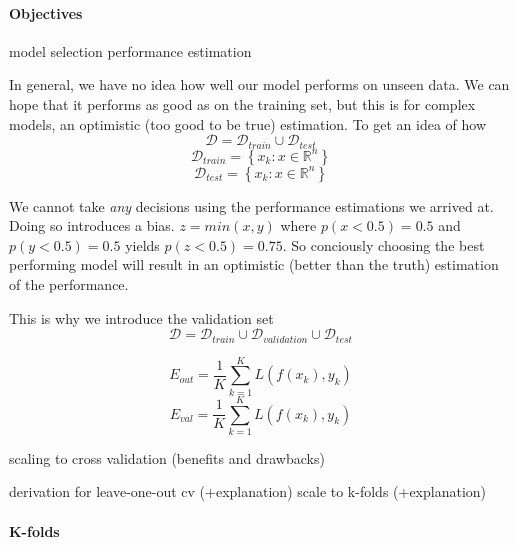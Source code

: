 \paragraph{Objectives}
   model selection
   performance estimation


In general, we have no idea how well our model performs on unseen data. We can hope that it performs as good as on the training set, but this is for complex models, an optimistic (too good to be true) estimation. To get an idea of how 
\begin{equation}
\mathcal{D} = \mathcal{D}_{train} \cup \mathcal{D}_{test}
\end{equation}
\begin{equation}
\mathcal{D}_{train} = \left\{x_k : x \in \mathbb{R}^{n}\right\}
\end{equation}
\begin{equation}
\mathcal{D}_{test} = \left\{x_k : x \in \mathbb{R}^{n}\right\}
\end{equation}



We cannot take \emph{any} decisions using the performance estimations we arrived at. Doing so introduces a bias.
$z = min( x, y )$ where $p(x<0.5) = 0.5$ and $p(y<0.5) = 0.5$ yields $p(z<0.5) = 0.75$. So conciously choosing the best performing model will result in an optimistic (better than the truth) estimation of the performance.

This is why we introduce the validation set
\begin{equation}
\mathcal{D} = \mathcal{D}_{train} \cup \mathcal{D}_{validation} \cup \mathcal{D}_{test}
\end{equation}


\begin{equation}
E_{out} = \frac{1}{K}\sum_{k=1}^{K}L(f(x_k), y_k)
\end{equation}
\begin{equation}
E_{val} = \frac{1}{K}\sum_{k=1}^{K}L(f(x_k), y_k)
\end{equation}

scaling to cross validation (benefits and drawbacks)

derivation for leave-one-out cv (+explanation)
scale to k-folds (+explanation)

\paragraph{K-folds}
